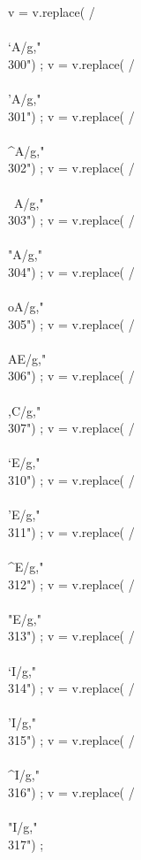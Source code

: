 {      v = v.replace(  /\\\\`A/g,"\\300") ;
      v = v.replace(  /\\\\'A/g,"\\301") ;
      v = v.replace(  /\\\\^A/g,"\\302") ;
      v = v.replace(  /\\\\~A/g,"\\303") ;
      v = v.replace(  /\\\\"A/g,"\\304") ;
      v = v.replace(  /\\\\oA/g,"\\305") ;
      v = v.replace(  /\\\\AE/g,"\\306") ;
      v = v.replace(  /\\\\,C/g,"\\307") ;
      v = v.replace(  /\\\\`E/g,"\\310") ;
      v = v.replace(  /\\\\'E/g,"\\311") ;
      v = v.replace(  /\\\\^E/g,"\\312") ;
      v = v.replace(  /\\\\"E/g,"\\313") ;
      v = v.replace(  /\\\\`I/g,"\\314") ;
      v = v.replace(  /\\\\'I/g,"\\315") ;
      v = v.replace(  /\\\\^I/g,"\\316") ;
      v = v.replace(  /\\\\"I/g,"\\317") ;
}
